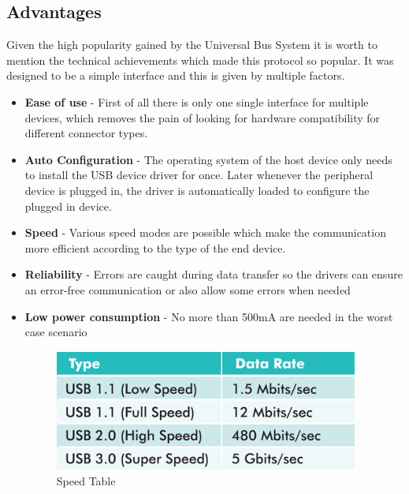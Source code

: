 \documentclass{article}
\begin{document}
\subsection{Advantages}
    Given the high popularity gained by the Universal Bus System it is worth to mention the technical achievements which made this protocol so popular. It was designed to be a simple interface and this is given by multiple factors.
\begin{itemize}
    \item\textbf{ Ease of use} -  First of all there is only one single interface for multiple devices, which removes the pain of looking for hardware compatibility for different connector types. 
    \item \textbf{Auto Configuration} - The operating system of the host device only needs to install the USB device driver for once. Later whenever the peripheral device is plugged in, the driver is automatically loaded to configure the plugged in device. 
    \item \textbf{Speed} - Various speed modes are possible  which make the communication more efficient according to the type of the end device.
    \item \textbf{Reliability} - Errors are caught during data transfer so the drivers can ensure an error-free communication or also allow some errors when needed
    \item\textbf{ Low power consumption} -  No more than 500mA are needed in the worst case scenario 
    \begin{figure}[h]    
    \centering
    \includegraphics[width=10cm, height=4cm,center]{images/speeds-table}
    \caption{Speed Table }
    \end{figure}

    
\end{itemize}
\end{document}
